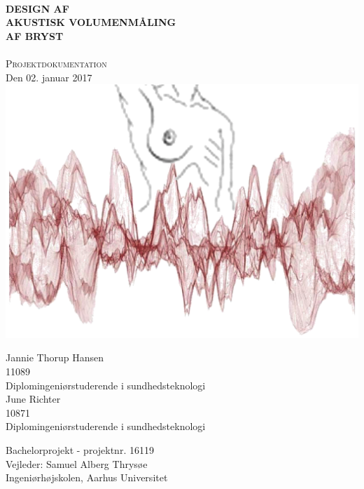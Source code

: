 
\thispagestyle{empty}	
\begin{center}
			\HRule{0.5pt} \\										%
			\LARGE \textbf{\uppercase{Design af\\ akustisk volumenmåling\\ af bryst}} \\	%
			\HRule{2pt} \\ [0.5cm]								%
			
			\normalsize \textsc{Projektdokumentation}\\
			 Den 02. januar 2017 \\

			
			\vspace{1.5cm}
	\includegraphics[width=5.5in]{forside.png}	


\begin{multicols}{2}
Jannie Thorup Hansen\\
11089\\
Diplomingeniørstuderende i sundhedsteknologi\\
\columnbreak
June Richter\\
10871\\
Diplomingeniørstuderende i sundhedsteknologi\\
\end{multicols}

		Bachelorprojekt - projektnr. 16119\\
		Vejleder: Samuel Alberg Thrysøe\\
		Ingeniørhøjskolen, Aarhus Universitet\\	
\end{center}


